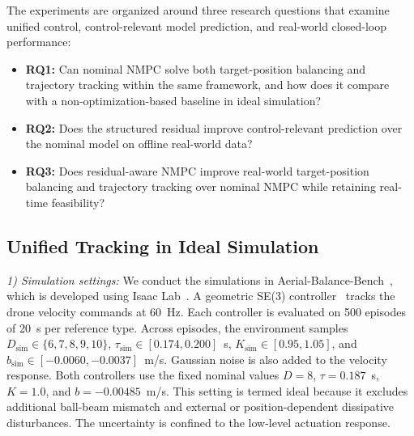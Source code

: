 \documentclass[letterpaper, 10 pt, conference]{ieeeconf}  %
\begin{document}
The experiments are organized around three research questions that examine unified control, control-relevant
model prediction, and real-world closed-loop performance:
\begin{itemize}
\item \textbf{RQ1:} Can nominal NMPC solve both
target-position balancing and trajectory tracking within the same framework, and how does it compare with a
non-optimization-based baseline in ideal simulation? 
\item \textbf{RQ2:} Does the structured residual
improve control-relevant prediction over the nominal model on offline real-world data? 
\item \textbf{RQ3:} Does residual-aware NMPC improve real-world target-position balancing and trajectory tracking over
nominal NMPC while retaining real-time feasibility? 
\end{itemize}

\subsection{Unified Tracking in Ideal Simulation}

\textit{1) Simulation settings:}
We conduct the simulations in Aerial-Balance-Bench~\cite{liu2026aerialBalanceBench}, which is developed using
Isaac Lab~\cite{2023_RAL_isaac_lab}. A geometric SE(3)
controller~\cite{2010_SE3_controller} tracks the drone velocity commands at 60~Hz. Each controller is evaluated
on 500 episodes of 20~s per reference type. Across
episodes, the environment samples $D_{\mathrm{sim}}\in\{6,7,8,9,10\}$,
$\tau_{\mathrm{sim}}\in[0.174,0.200]$~s, $K_{\mathrm{sim}}\in[0.95,1.05]$, and
$b_{\mathrm{sim}}\in[-0.0060,-0.0037]$~m/s. Gaussian noise is also added to the velocity response. Both
controllers use the fixed nominal values $D=8$,
$\tau=0.187$~s, $K=1.0$, and $b=-0.00485$~m/s. This setting is termed ideal because it excludes additional
ball-beam mismatch and external or position-dependent dissipative disturbances. The uncertainty is confined to the
low-level actuation response.
\end{document}
